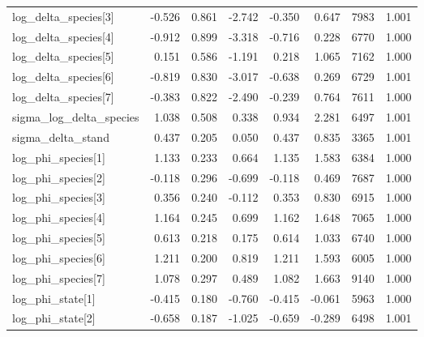 \begin{longtable}[t]{lrrrrrrr}
log\_delta\_species[3] & -0.526 & 0.861 & -2.742 & -0.350 & 0.647 & 7983 & 1.001\\
\addlinespace
log\_delta\_species[4] & -0.912 & 0.899 & -3.318 & -0.716 & 0.228 & 6770 & 1.000\\
log\_delta\_species[5] & 0.151 & 0.586 & -1.191 & 0.218 & 1.065 & 7162 & 1.000\\
log\_delta\_species[6] & -0.819 & 0.830 & -3.017 & -0.638 & 0.269 & 6729 & 1.001\\
log\_delta\_species[7] & -0.383 & 0.822 & -2.490 & -0.239 & 0.764 & 7611 & 1.000\\
sigma\_log\_delta\_species & 1.038 & 0.508 & 0.338 & 0.934 & 2.281 & 6497 & 1.001\\
\addlinespace
sigma\_delta\_stand & 0.437 & 0.205 & 0.050 & 0.437 & 0.835 & 3365 & 1.001\\
log\_phi\_species[1] & 1.133 & 0.233 & 0.664 & 1.135 & 1.583 & 6384 & 1.000\\
log\_phi\_species[2] & -0.118 & 0.296 & -0.699 & -0.118 & 0.469 & 7687 & 1.000\\
log\_phi\_species[3] & 0.356 & 0.240 & -0.112 & 0.353 & 0.830 & 6915 & 1.000\\
log\_phi\_species[4] & 1.164 & 0.245 & 0.699 & 1.162 & 1.648 & 7065 & 1.000\\
\addlinespace
log\_phi\_species[5] & 0.613 & 0.218 & 0.175 & 0.614 & 1.033 & 6740 & 1.000\\
log\_phi\_species[6] & 1.211 & 0.200 & 0.819 & 1.211 & 1.593 & 6005 & 1.000\\
log\_phi\_species[7] & 1.078 & 0.297 & 0.489 & 1.082 & 1.663 & 9140 & 1.000\\
log\_phi\_state[1] & -0.415 & 0.180 & -0.760 & -0.415 & -0.061 & 5963 & 1.000\\
log\_phi\_state[2] & -0.658 & 0.187 & -1.025 & -0.659 & -0.289 & 6498 & 1.001\\
\bottomrule
\end{longtable}
